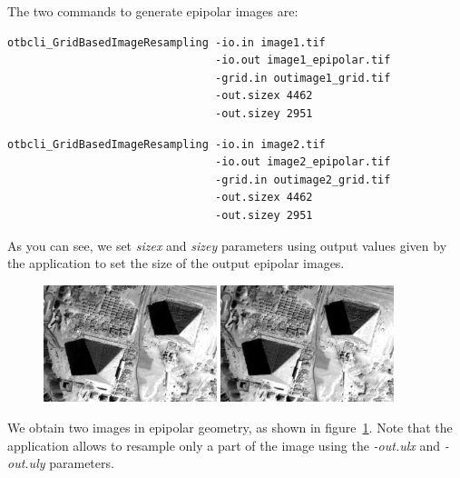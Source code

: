 The two commands to generate epipolar images are:
\begin{verbatim}
otbcli_GridBasedImageResampling -io.in image1.tif
                                -io.out image1_epipolar.tif
                                -grid.in outimage1_grid.tif
                                -out.sizex 4462
                                -out.sizey 2951
\end{verbatim}

\begin{verbatim}
otbcli_GridBasedImageResampling -io.in image2.tif
                                -io.out image2_epipolar.tif
                                -grid.in outimage2_grid.tif
                                -out.sizex 4462
                                -out.sizey 2951
\end{verbatim}

As you can see, we set \textit{sizex} and \textit{sizey} parameters
using output values given by
the  application to set
the size of the output epipolar images.

\begin{figure}[!h]
  \center
  \includegraphics[width=0.45\textwidth]{../Art/MonteverdiImages/stereo_image1_epipolar.png}
  \includegraphics[width=0.45\textwidth]{../Art/MonteverdiImages/stereo_image2_epipolar.png}
  \label{fig:EpipolarImages}
\end{figure}

We obtain two images in epipolar geometry, as shown in
figure~\ref{fig:EpipolarImages}. Note that the application allows to
resample only a part of the image using the \textit{-out.ulx}
and \textit{-out.uly} parameters.

